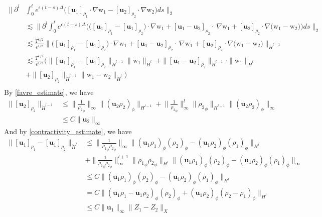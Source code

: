 \documentclass[11pt,letterpaper]{amsart}
\theoremstyle{plain}
\theoremstyle{definition}
\theoremstyle{remark}
\renewcommand{\leq}{\leqslant}
\def\u{\textbf{u}}
\def \wt {\mathrm{w}}
\begin{document}
\begin{align*}
    \Big\| \partial^l 
        &\int_0^t e^{\epsilon(t-s) \Delta} \Big( 
            [\u_1]_{\rho_1} \cdot \nabla \wt_1 -  [\u_2]_{\rho_2} \cdot \nabla \wt_2 \Big) ds \Big\|_2 \\
        &\lesssim \Big\| \partial^l \int_0^t e^{\epsilon(t-s) \Delta} \Big( 
            \big( [\u_1]_{\rho_1} - [\u_1]_{\rho_2} \big) \cdot \nabla \wt_1 + [\u_1 - \u_2]_{\rho_2} \cdot \ 
            \nabla \wt_1 + [\u_2]_{\rho_2} \cdot \nabla \big(\wt_1 - \wt_2 \big) \Big) ds \Big\|_2 \\
        &\lesssim \frac{T^{1/2}}{\epsilon^{1/2}} \Big\| 
            \big( [\u_1]_{\rho_1} - [\u_1]_{\rho_2} \big) \cdot \nabla \wt_1 + [\u_1 - \u_2]_{\rho_2} \cdot \ 
            \nabla \wt_1 + [\u_2]_{\rho_2} \cdot \nabla \big(\wt_1 - \wt_2 \big) \Big\|_{\dot{H}^{l-1}} \\
        &\lesssim \frac{T^{1/2}}{\epsilon^{1/2}} \Big(  
            \| [\u_1]_{\rho_1} - [\u_1]_{\rho_2} \|_{\dot{H}^{l-1}} \| \wt_1 \|_{\dot{H}^{l}} \  
            + \| [\u_1 - \u_2]_{\rho_2} \|_{\dot{H}^{l-1}} \cdot \| \wt_1\|_{\dot{H}^{l}} \\
            &+ \| [\u_2]_{\rho_2}\|_{\dot{H}^{l-1}}  \| \wt_1 - \wt_2 \|_{\dot{H}^{l}} \Big) \\
\end{align*}
By \ref{favre_estimate}, we have 
\begin{align*}
    \|[\u_2]_{\rho_2}\|_{\dot{H}^{l-1}} 
        &\leq \Big\| \frac{1}{{\rho_2}_{\phi}} \Big\|_{\infty} \|(\u_2 \rho_2)_{\phi} \|_{H^{l-1}}
            + \Big\| \frac{1}{{\rho_2}_{\phi}} \Big\|_{\infty}^{l} \| {\rho_2}_{\phi} \|_{H^{l-1}} \|(\u_2 \rho_2)_{\phi} \|_{\infty} \\
        &\leq C \|\u_2\|_{\infty} 
\end{align*}
And by \ref{contractivity_estimate}, we have 
\begin{align*}
    \|[\u_1]_{\rho_1} - [\u_1]_{\rho_2}\|_{\dot{H}^{l}}  
        &\leq \Big\| \frac{1}{{\rho_1}_{\phi} {\rho_2}_{\phi}} \Big\|_{\infty} 
        \| (\u_1 \rho_1)_{\phi} ({\rho_2})_{\phi} - (\u_1 \rho_2)_{\phi} ({\rho_1})_{\phi} \|_{H^l} \\
    &+ \Big\| \frac{1}{{\rho_1}_{\phi} {\rho_2}_{\phi}} \Big\|_{\infty}^{l+1} \| {\rho_1}_{\phi} {\rho_2}_{\phi} \|_{H^l}
    \| (\u_1 \rho_1)_{\phi} ({\rho_2})_{\phi} - (\u_1 \rho_2)_{\phi} ({\rho_1})_{\phi} \|_{\infty} \\
    &\leq C \| (\u_1 \rho_1)_{\phi} ({\rho_2})_{\phi} - (\u_1 \rho_2)_{\phi} ({\rho_1})_{\phi} \|_{H^l} \\
    &= C \| ({\u_1 \rho_1- \u_1\rho_2})_{\phi} ({\rho_2})_{\phi} + (\u_1 {\rho_2})_{\phi} ({\rho_2 - \rho_1})_{\phi} \|_{H^l} \\
    &\leq C \|\u_1\|_{\infty} \| Z_1 - Z_2 \|_X  \\
\end{align*}
\end{document}
